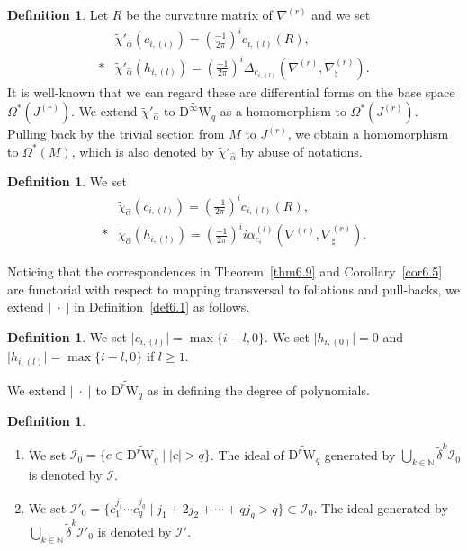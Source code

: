 \documentclass[12pt]{amsart}
\newcommand{\N}{{\mathbb N}}
\newcommand{\W}{\mathrm{W}}
\newcommand{\D}{\mathrm{D}}
\newcommand{\norm}[1]{\lvert#1\rvert}
\theoremstyle{definition}
\newtheorem{definition}[theorem]{Definition}
\theoremstyle{remark}
\begin{document}
\begin{definition}
\label{def7.2}
Let $R$ be the curvature matrix of $\nabla^{(r)}$ and we set
\begin{align*}
&\widetilde\chi'_{\widehat\alpha}(c_{i,(l)})=\left(\frac{-1}{2\pi}\right)^ic_{i,(l)}(R),\\*
&\widetilde\chi'_{\widehat\alpha}(h_{i,(l)})=\left(\frac{-1}{2\pi}\right)^i\Delta_{c_{i,(l)}}(\nabla^{(r)},\nabla_\natural^{(r)}).
\end{align*}
It is well-known that we can regard these are differential forms on the base space $\Omega^*(J^{(r)})$.
We extend $\widetilde\chi'_{\widehat\alpha}$ to $\widetilde{\D^\infty\W}_q$ as a homomorphism to $\Omega^*(J^{(r)})$.
Pulling back by the trivial section from $M$ to $J^{(r)}$, we obtain a homomorphism to $\Omega^*(M)$, which is also denoted by $\widetilde\chi'_{\widehat\alpha}$ by abuse of notations.
\end{definition}

\begin{definition}
We set
\begin{align*}
&\widetilde\chi_{\widehat\alpha}(c_{i,(l)})=\left(\frac{-1}{2\pi}\right)^ic_{i,(l)}(R),\\*
&\widetilde\chi_{\widehat\alpha}(h_{i,(l)})=\left(\frac{-1}{2\pi}\right)^ii\alpha^{(l)}_{c_i}(\nabla^{(r)},\nabla_\natural^{(r)}).
\end{align*}
\end{definition}

Noticing that the correspondences in Theorem~\ref{thm6.9} and Corollary~\ref{cor6.5} are functorial with respect to mapping transversal to foliations and pull-backs, we extend $\norm{\;\cdot\;}$ in Definition~\ref{def6.1} as follows.

\begin{definition}
\label{def7.10}
We set $\norm{c_{i,(l)}}=\max\{i-l,0\}$.
We set $\norm{h_{i,(0)}}=0$ and $\norm{h_{i,(l)}}=\max\{i-l,0\}$ if $l\geq1$.
\end{definition}
We extend $\norm{\;\cdot\;}$ to $\widetilde{\D^r\W_q}$ as in defining the degree of polynomials.

\begin{definition}
\label{relations}
\begin{enumerate}
\item
We set $\mathscr{I}_0=\{c\in\widetilde{\D^r\W_q}\mid\norm{c}>q\}$.
The ideal of $\widetilde{\D^r\W_q}$ generated by $\bigcup_{k\in\N}\widetilde\delta^k\mathscr{I}_0$ is denoted by $\mathscr{I}$.
\item
We set $\mathscr{I}'_0=\{c_1^{j_1}\cdots c_q^{j_q}\mid j_1+2j_2+\cdots+qj_q>q\}\subset\mathscr{I}_0$.
The ideal generated by $\bigcup_{k\in\N}\widetilde\delta^k\mathscr{I}'_0$ is denoted by $\mathscr{I}'$.
\end{enumerate}
\end{definition}
\end{document}
